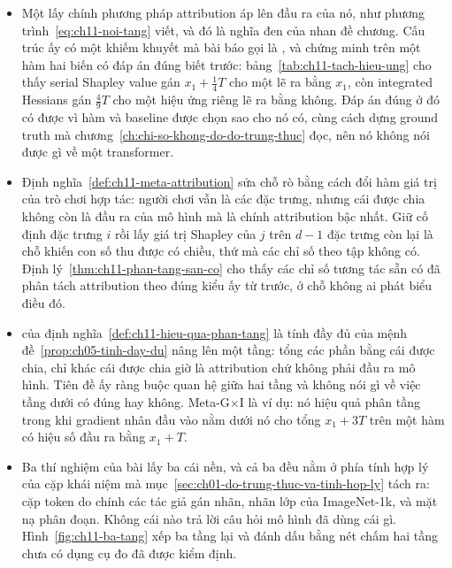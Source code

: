 \begin{tomtat}
\begin{itemize}
  \item Một  lấy chính phương pháp attribution áp lên đầu
  ra của nó, như phương trình~\ref{eq:ch11-noi-tang} viết, và đó là nghĩa đen
  của nhan đề chương. Cấu trúc ấy có một khiếm khuyết mà bài báo gọi là
  , và chứng minh trên một hàm hai biến
  có đáp án đúng biết trước:
  bảng~\ref{tab:ch11-tach-hieu-ung} cho thấy serial Shapley value gán
  $x_1 + \tfrac{1}{4}T$ cho một  lẽ ra bằng $x_1$, còn integrated
  Hessians gán $\tfrac{4}{9}T$ cho một hiệu ứng riêng lẽ ra bằng không. Đáp án
  đúng ở đó có được vì hàm và baseline được chọn sao cho nó có, cùng cách dựng
  ground truth mà chương~\ref{ch:chi-so-khong-do-do-trung-thuc} đọc, nên nó
  không nói được gì về một transformer.

  \item Định nghĩa~\ref{def:ch11-meta-attribution} sửa chỗ rò bằng cách đổi hàm
  giá trị của trò chơi hợp tác: người chơi vẫn là các đặc trưng, nhưng cái được
  chia không còn là đầu ra của mô hình mà là chính attribution bậc nhất. Giữ cố
  định đặc trưng $i$ rồi lấy giá trị Shapley của $j$ trên $d-1$ đặc trưng còn
  lại là chỗ khiến con số thu được có chiều, thứ mà các chỉ số theo tập không
  có. Định lý~\ref{thm:ch11-phan-tang-san-co} cho thấy các chỉ số tương tác sẵn
  có đã phân tách attribution theo đúng kiểu ấy từ trước, ở chỗ không ai phát
  biểu điều đó.

  \item {} của
  định nghĩa~\ref{def:ch11-hieu-qua-phan-tang}
  là tính đầy đủ của mệnh đề~\ref{prop:ch05-tinh-day-du} nâng lên một tầng: tổng
  các phần bằng cái được chia, chỉ khác cái được chia giờ là attribution chứ
  không phải đầu ra mô hình. Tiên đề ấy ràng buộc quan hệ giữa hai tầng và
  không nói gì về việc tầng dưới có đúng hay không. Meta-G$\times$I là ví dụ:
  nó hiệu quả phân tầng trong khi gradient nhân đầu vào nằm dưới nó cho tổng
  $x_1 + 3T$ trên một hàm có hiệu số đầu ra bằng $x_1 + T$.

  \item Ba thí nghiệm của bài lấy ba cái nền, và cả ba đều nằm ở phía tính hợp
  lý của cặp khái niệm mà mục~\ref{sec:ch01-do-trung-thuc-va-tinh-hop-ly} tách
  ra: cặp token do chính các tác giả gán nhãn, nhãn lớp của ImageNet-1k, và mặt
  nạ phân đoạn. Không cái nào trả lời câu hỏi mô hình đã dùng cái gì.
  Hình~\ref{fig:ch11-ba-tang} xếp ba tầng lại và đánh dấu bằng nét chấm hai
  tầng chưa có dụng cụ đo đã được kiểm định.


\end{itemize}
\end{tomtat}
